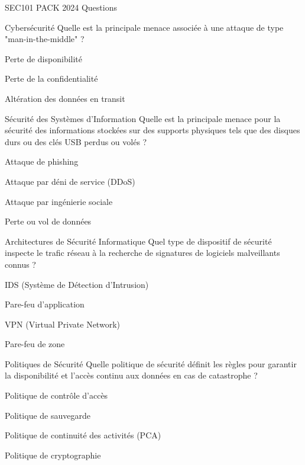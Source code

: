 \documentclass[12pt]{article}
\begin{document}
\begin{quiz}{SEC101 PACK 2024 Questions}
  \begin{multi}[points=1]{Cybersécurité}
    Quelle est la principale menace associée à une attaque de type "man-in-the-middle" ?
    \item Perte de disponibilité
    \item Perte de la confidentialité
    \item* Altération des données en transit
  \end{multi}


\begin{multi}[points=1]{Sécurité des Systèmes d'Information}
    Quelle est la principale menace pour la sécurité des informations stockées sur des supports physiques tels que des disques durs ou des clés USB perdus ou volés ?
    \item Attaque de phishing
    \item Attaque par déni de service (DDoS)
    \item Attaque par ingénierie sociale
    \item* Perte ou vol de données
  \end{multi}
  


  \begin{multi}[points=1]{Architectures de Sécurité Informatique}
    Quel type de dispositif de sécurité inspecte le trafic réseau à la recherche de signatures de logiciels malveillants connus ?
    \item* IDS (Système de Détection d'Intrusion)
    \item Pare-feu d'application
    \item VPN (Virtual Private Network)
    \item Pare-feu de zone
  \end{multi}

  \begin{multi}[points=1]{Politiques de Sécurité}
    Quelle politique de sécurité définit les règles pour garantir la disponibilité et l'accès continu aux données en cas de catastrophe ?
    \item Politique de contrôle d'accès
    \item Politique de sauvegarde
    \item* Politique de continuité des activités (PCA)
    \item Politique de cryptographie
  \end{multi}


\end{quiz}
\end{document}
